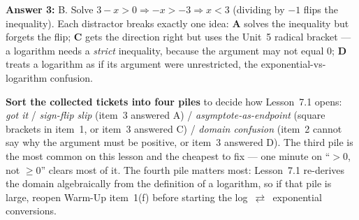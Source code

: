 \documentclass[10pt]{article}
\begin{document}
\begin{teachernote}
\textbf{Answer 3:} B. Solve $3-x>0 \Rightarrow -x>-3 \Rightarrow x<3$ (dividing by $-1$ flips the
inequality). Each distractor breaks exactly one idea: \textbf{A} solves the inequality but forgets
the flip; \textbf{C} gets the direction right but uses the Unit~5 radical bracket --- a logarithm
needs a \emph{strict} inequality, because the argument may not equal $0$; \textbf{D} treats a
logarithm as if its argument were unrestricted, the exponential-vs-logarithm confusion.

\textbf{Sort the collected tickets into four piles} to decide how Lesson~7.1 opens:
\emph{got it} / \emph{sign-flip slip} (item~3 answered A) / \emph{asymptote-as-endpoint} (square
brackets in item~1, or item~3 answered C) / \emph{domain confusion} (item~2 cannot say why the
argument must be positive, or item~3 answered D). The third pile is the most common on this lesson
and the cheapest to fix --- one minute on ``$>0$, not $\ge 0$'' clears most of it. The fourth pile
matters most: Lesson~7.1 re-derives the domain algebraically from the definition of a logarithm, so
if that pile is large, reopen Warm-Up item~1(f) before starting the log~$\rightleftarrows$~exponential
conversions.
\end{teachernote}
\end{document}

